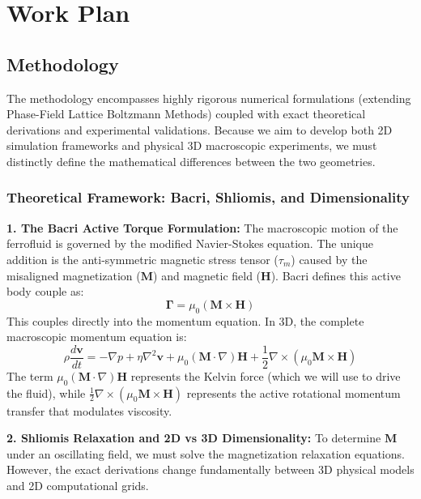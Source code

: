 \documentclass[11pt, a4paper]{article}
\begin{document}
\newpage
\section{Work Plan}

\subsection{Methodology}

The methodology encompasses highly rigorous numerical formulations (extending Phase-Field Lattice Boltzmann Methods) coupled with exact theoretical derivations and experimental validations. Because we aim to develop both 2D simulation frameworks and physical 3D macroscopic experiments, we must distinctly define the mathematical differences between the two geometries.

\subsubsection{Theoretical Framework: Bacri, Shliomis, and Dimensionality}

\textbf{1. The Bacri Active Torque Formulation:}
The macroscopic motion of the ferrofluid is governed by the modified Navier-Stokes equation. The unique addition is the anti-symmetric magnetic stress tensor ($\tau_m$) caused by the misaligned magnetization ($\mathbf{M}$) and magnetic field ($\mathbf{H}$). Bacri defines this active body couple as:
\begin{equation}
    \mathbf{\Gamma} = \mu_0 (\mathbf{M} \times \mathbf{H})
\end{equation}
This couples directly into the momentum equation. In 3D, the complete macroscopic momentum equation is:
\begin{equation}
    \rho \frac{d\mathbf{v}}{dt} = -\nabla p + \eta \nabla^2 \mathbf{v} + \mu_0(\mathbf{M} \cdot \nabla)\mathbf{H} + \frac{1}{2}\nabla \times (\mu_0 \mathbf{M} \times \mathbf{H})
\end{equation}
The term $\mu_0(\mathbf{M} \cdot \nabla)\mathbf{H}$ represents the Kelvin force (which we will use to drive the fluid), while $\frac{1}{2}\nabla \times (\mu_0 \mathbf{M} \times \mathbf{H})$ represents the active rotational momentum transfer that modulates viscosity.

\textbf{2. Shliomis Relaxation and 2D vs 3D Dimensionality:}
To determine $\mathbf{M}$ under an oscillating field, we must solve the magnetization relaxation equations. However, the exact derivations change fundamentally between 3D physical models and 2D computational grids.
\end{document}
